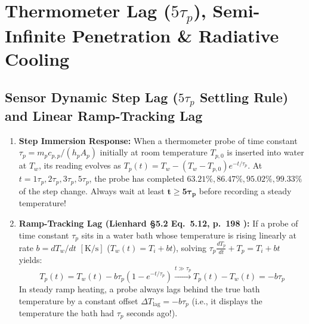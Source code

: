 \begin{center}
\label{fig:13:biot-regimes}
\end{center}

\section{Thermometer Lag ($5\tau_p$), Semi-Infinite Penetration \& Radiative Cooling}
\label{sec:13.3}

\subsection{Sensor Dynamic Step Lag ($5\tau_p$ Settling Rule) and Linear Ramp-Tracking Lag}
\begin{enumerate}
  \item \textbf{Step Immersion Response:} When a thermometer probe of time constant $\tau_p = m_p c_{p,p}/(h_p A_p)$ initially at room temperature $T_{p,0}$ is inserted into water at $T_w$, its reading evolves as $T_p(t) = T_w - (T_w - T_{p,0})e^{-t/\tau_p}$. At $t = 1\tau_p, 2\tau_p, 3\tau_p, 5\tau_p$, the probe has completed $63.21\%, 86.47\%, 95.02\%, \mathbf{99.33\%}$ of the step change. Always wait at least $\mathbf{t \ge 5\tau_p}$ before recording a steady temperature!
  \item \textbf{Ramp-Tracking Lag (Lienhard §5.2 Eq.~5.12, p.~198 ):} If a probe of time constant $\tau_p$ sits in a water bath whose temperature is rising linearly at rate $b = dT_w/dt$ $[\si{\kelvin\per\second}]$ ($T_w(t) = T_i + b t$), solving $\tau_p \frac{dT_p}{dt} + T_p = T_i + b t$ yields:
  \begin{equation}
    T_p(t) = T_w(t) - b \tau_p\left(1 - e^{-t/\tau_p}\right) \xrightarrow{t \gg \tau_p} T_p(t) - T_w(t) = -b \tau_p
    \label{eq:13:ramp-lag}
  \end{equation}
  In steady ramp heating, a probe always lags behind the true bath temperature by a constant offset $\Delta T_{\mathrm{lag}} = -b\tau_p$ (i.e., it displays the temperature the bath had $\tau_p$ seconds ago!).
\end{enumerate}

